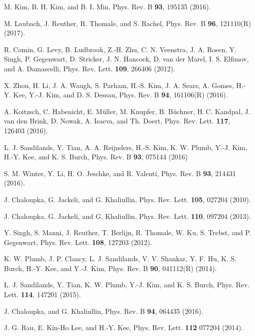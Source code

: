 \documentclass[aps,prb,fleqn,12pt,amsmath,amssymb]{revtex4}
\begin{document}
\begin{thebibliography}{99}
 M. Kim, B. H. Kim, and B. I. Min, Phys. Rev. B {\bf 93}, 195135 (2016). 

 M. Laubach, J. Reuther, R. Thomale, and S. Rachel, Phys. Rev. B {\bf 96}, 121110(R) (2017).

 R. Comin, G. Levy, B. Ludbrook, Z.-H. Zhu, C. N. Veenstra, J. A. Rosen, Y. Singh, P. Gegenwart, D. Stricker, J. N. Hancock, D. van der Marel, I. S. Elfimov, and A. Damascelli, Phys. Rev. Lett. {\bf 109}, 266406 (2012).

 X. Zhou, H. Li, J. A. Waugh, S. Parham, H.-S. Kim, J. A. Sears, A. Gomes, H.-Y. Kee, Y.-J. Kim, and D. S. Dessau, Phys. Rev. B {\bf 94}, 161106(R) (2016).

 A. Koitzsch, C. Habenicht, E. M\"uller, M. Knupfer, B. B\"uchner, H. C. Kandpal, J. van den Brink, D. Nowak, A. Isaeva, and Th. Doert, Phys. Rev. Lett. {\bf 117}, 126403 (2016).

 L. J. Sandilands, Y. Tian, A. A. Reijnders, H.-S. Kim, K. W. Plumb, Y.-J. Kim, H.-Y. Kee, and K. S. Burch, Phys. Rev. B {\bf 93}, 075144 (2016)

 S. M. Winter, Y. Li, H. O. Jeschke, and R. Valent{\'i}, Phys. Rev. B {\bf 93}, 214431 (2016).

 J. Chaloupka, G. Jackeli, and G. Khaliullin, Phys. Rev. Lett. {\bf 105}, 027204 (2010).

 J. Chaloupka, G. Jackeli, and G. Khaliullin, Phys. Rev. Lett. {\bf 110}, 097204 (2013).

 Y. Singh, S. Manni, J. Reuther, T. Berlijn, R. Thomale, W. Ku, S. Trebst, and P. Gegenwart, Phys. Rev. Lett. {\bf 108}, 127203 (2012).

 K. W. Plumb, J. P. Clancy, L. J. Sandilands, V. V. Shankar, Y. F. Hu, K. S. Burch, H.-Y. Kee, and Y.-J. Kim,  Phys. Rev. B {\bf 90},  041112(R) (2014).

 L. J. Sandilands, Y. Tian, K. W. Plumb, Y.-J. Kim, and K. S. Burch, Phys. Rev. Lett. {\bf 114}, 147201 (2015).

 J. Chaloupka, and G. Khaliullin, Phys. Rev. B {\bf 94}, 064435 (2016).

 J. G. Rau, E. Kin-Ho Lee, and H.-Y. Kee, Phys. Rev. Lett. {\bf 112} 077204 (2014).


\end{thebibliography}
\end{document}
